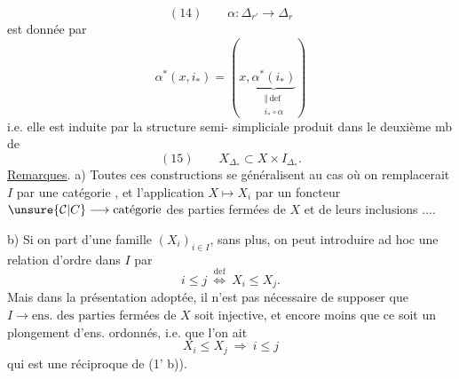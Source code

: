 \[
(14)\qquad\alpha:\Delta_{r'}\longrightarrow\Delta_r
\]
est donnée par
\[
\alpha^*(x,i_*)=(x,\underbrace{\alpha^*(i_*)}_{\substack{\Vert\,\mathrm{def}\\i_*\circ\alpha}})
\]
i.e. elle est induite par la structure semi-
simpliciale produit dans le deuxième mb de
\[
(15)\qquad X_{\Delta_*}\subset X\times I_{\Delta_*}.
\]
\uline{Remarques}. a) Toutes ces constructions se généralisent au
cas où on remplacerait  $I$ par une catégorie , et
l'application $X\mapsto X_i$ par un foncteur $\unsure{\mathcal{C}|C}\longrightarrow\text{catégorie}$
des parties fermées de $X$ et de leurs inclusions
....

b) Si on part d'une famille $(X_i)_{i\in I}$,  sans
plus, on peut introduire ad hoc une relation
d'ordre dans $I$ par 
\[
i\leq j\ \overset{\mathrm{def}}{\Longleftrightarrow}\ X_i\leq X_j.
\]
Mais dans la présentation adoptée, il n'est pas
nécessaire de supposer que  $I\longrightarrow\text{ens. des parties}$
fermées de $X$ soit injective, et encore moins
que ce soit un plongement d'ens. ordonnés,
i.e. que l'on ait
\[
X_i\leq X_j\ \Longrightarrow\ i\leq j
\]
qui est une réciproque de (1' b)).
